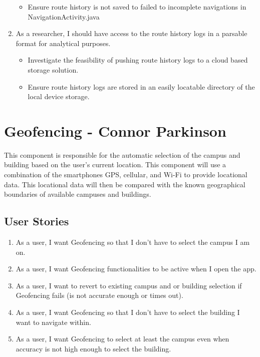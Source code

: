 \documentclass{scrreprt}
\begin{document}
\begin{enumerate}
		\begin{itemize}
			\item Ensure route history is not saved to failed to incomplete navigations in NavigationActivity.java
		\end{itemize}
	
	\item As a researcher, I should have access to the route history logs in a parsable format for analytical purposes.
	
		\begin{itemize}
			\item Investigate the feasibility of pushing route history logs to a cloud based storage solution.
			\item Ensure route history logs are stored in an easily locatable directory of the local device storage.
		\end{itemize}
	
\end{enumerate}

\pagebreak

\section{Geofencing - Connor Parkinson}
This component is responsible for the automatic selection of the campus and building based on the user’s current location. This component will use a combination of the smartphones GPS, cellular, and Wi-Fi to provide locational data. This locational data will then be compared with the known geographical boundaries of available campuses and buildings.

\subsection{User Stories}
\begin{enumerate}
	\item As a user, I want Geofencing so that I don't have to select the campus I am on.
	\item As a user, I want Geofencing functionalities to be active when I open the app.
	\item As a user, I want to revert to existing campus and or building selection if Geofencing fails (is not accurate enough or times out).
	\item As a user, I want Geofencing so that I don't have to select the building I want to navigate within.
	\item As a user, I want Geofencing to select at least the campus even when accuracy is not high enough to select the building.
\end{enumerate}
\end{document}
